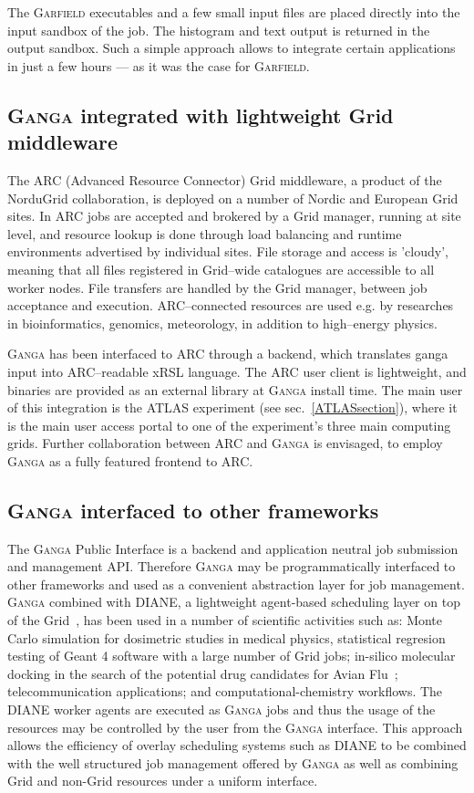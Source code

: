 \documentclass{elsart}
\def\ganga {\textsc{Ganga}\xspace}
\def\garfield {\textsc{Garfield}\xspace}
\def\diane {\textsc{DIANE}\xspace}
\def\grid {Grid\xspace}
\begin{document}
The \garfield executables and a few small input files are placed directly into
the input sandbox of the job. The histogram and text output is returned in the
output sandbox. Such a simple approach allows to integrate certain
applications in just a few hours --- as it was the case for \garfield.

\subsection{\ganga integrated with lightweight \grid middleware}

The ARC (Advanced Resource Connector) \grid middleware\cite{ARC}, a
product of the NorduGrid collaboration\cite{NorduGrid}, is deployed on a
number of Nordic and European \grid sites. In ARC jobs are accepted and
brokered by a \grid manager, running at site level, and resource lookup
is done through load balancing and runtime environments advertised by
individual sites. File storage and access is 'cloudy', meaning that
all files registered in \grid--wide catalogues are accessible to all
worker nodes. File transfers are handled by the \grid manager, between
job acceptance and execution. ARC--connected resources are used
e.g. by researches in bioinformatics, genomics, meteorology, in
addition to high--energy physics.

\ganga has been interfaced to ARC through a backend, which translates
ganga input into ARC--readable xRSL language. The ARC user client is
lightweight, and binaries are provided as an external library at \ganga
install time. The main user of this integration is the ATLAS
experiment (see sec.~\ref{ATLASsection}), where it is the main user
access portal to one of the experiment's three main computing
grids. Further collaboration between ARC and \ganga is envisaged, to
employ \ganga as a fully featured frontend to ARC.


\subsection{\ganga interfaced to other frameworks}
\label{sec:GangaInOtherFrameworks}
The \ganga Public Interface is a backend and application neutral job
submission and management API. Therefore \ganga may be programmatically
interfaced to other frameworks and used as a convenient abstraction layer for
job management. \ganga combined with \diane, a lightweight agent-based
scheduling layer on top of the \grid~\cite{DIANE}, has been used in a number
of scientific activities such as: Monte Carlo simulation for dosimetric
studies in medical physics, statistical regresion testing of Geant 4 \cite{Geant4}
software
with a large number of \grid jobs; in-silico molecular docking in the search
of the potential drug candidates for Avian Flu~\cite{AvianFlu};
telecommunication applications; and computational-chemistry workflows. The
\diane worker agents are executed as \ganga jobs and thus the usage of the
resources may be controlled by the user from the \ganga interface. This
approach allows the efficiency of overlay scheduling systems such
as \diane to be combined with the well structured job management offered by \ganga as well as
combining \grid and non-\grid resources under a uniform interface.
\end{document}
